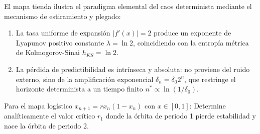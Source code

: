 \documentclass[11pt,a4paper]{article}
\newenvironment{conclusion}[1][Interpretación Dinámica y Conclusión]{%
    \vspace{2mm}%
    \noindent{\large\textbf{Conclusión:}}\par\vspace{1.5mm}%
}{%
    \par\vspace{3mm}%
}
\begin{document}
\begin{conclusion}
El mapa tienda ilustra el paradigma elemental del caos determinista mediante el mecanismo de estiramiento y plegado:
\begin{enumerate}
    \item La tasa uniforme de expansión $|f'(x)| = 2$ produce un exponente de Lyapunov positivo constante $\lambda = \ln 2$, coincidiendo con la entropía métrica de Kolmogorov-Sinai $h_{KS} = \ln 2$.
    \item La pérdida de predictibilidad es intrínseca y absoluta: no proviene del ruido externo, sino de la amplificación exponencial $\delta_n = \delta_0 2^n$, que restringe el horizonte determinista a un tiempo finito $n^* \propto \ln(1/\delta_0)$.
\end{enumerate}
\end{conclusion}

\vspace{3mm}

\begin{problema}[Problema 4.2]
Para el mapa logístico $x_{n+1} = r x_n(1 - x_n)$ con $x \in [0, 1]$:
Determine analíticamente el valor crítico $r_1$ donde la órbita de periodo 1 pierde estabilidad y nace la órbita de periodo 2.
\end{problema}
\end{document}
